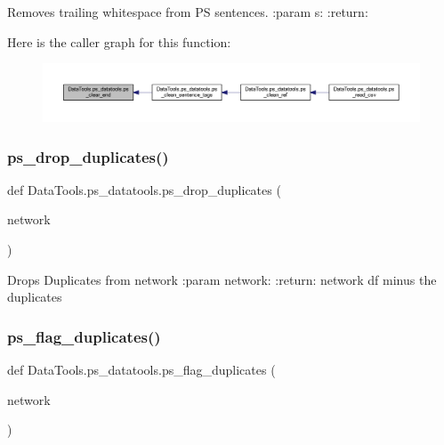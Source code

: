\begin{DoxyVerb}Removes trailing whitespace from PS sentences.
:param s:
:return:
\end{DoxyVerb}
 Here is the caller graph for this function\+:
\nopagebreak
\begin{figure}[H]
\begin{center}
\leavevmode
\includegraphics[width=350pt]{namespace_data_tools_1_1ps__datatools_aa1f7c645ca04ccce524923614553e377_icgraph}
\end{center}
\end{figure}
\mbox{\label{namespace_data_tools_1_1ps__datatools_aa87f89a53b8e244f6a35933c96d7df47}} 
\subsubsection{\texorpdfstring{ps\+\_\+drop\+\_\+duplicates()}{ps\_drop\_duplicates()}}
{\footnotesize\ttfamily def Data\+Tools.\+ps\+\_\+datatools.\+ps\+\_\+drop\+\_\+duplicates (\begin{DoxyParamCaption}\item[{}]{network }\end{DoxyParamCaption})}

\begin{DoxyVerb}Drops Duplicates from network
:param network:
:return: network df minus the duplicates
\end{DoxyVerb}
 \mbox{\label{namespace_data_tools_1_1ps__datatools_af2b808b4e4c01897013a7931711dfc1e}} 
\subsubsection{\texorpdfstring{ps\+\_\+flag\+\_\+duplicates()}{ps\_flag\_duplicates()}}
{\footnotesize\ttfamily def Data\+Tools.\+ps\+\_\+datatools.\+ps\+\_\+flag\+\_\+duplicates (\begin{DoxyParamCaption}\item[{}]{network }\end{DoxyParamCaption})}

